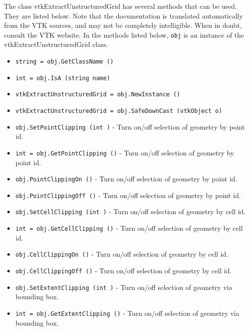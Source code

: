 The class vtkExtractUnstructuredGrid has several methods that can be used.
  They are listed below.
Note that the documentation is translated automatically from the VTK sources,
and may not be completely intelligible.  When in doubt, consult the VTK website.
In the methods listed below, \verb|obj| is an instance of the vtkExtractUnstructuredGrid class.
\begin{itemize}
\item  \verb|string = obj.GetClassName ()|

\item  \verb|int = obj.IsA (string name)|

\item  \verb|vtkExtractUnstructuredGrid = obj.NewInstance ()|

\item  \verb|vtkExtractUnstructuredGrid = obj.SafeDownCast (vtkObject o)|

\item  \verb|obj.SetPointClipping (int )| -  Turn on/off selection of geometry by point id.

\item  \verb|int = obj.GetPointClipping ()| -  Turn on/off selection of geometry by point id.

\item  \verb|obj.PointClippingOn ()| -  Turn on/off selection of geometry by point id.

\item  \verb|obj.PointClippingOff ()| -  Turn on/off selection of geometry by point id.

\item  \verb|obj.SetCellClipping (int )| -  Turn on/off selection of geometry by cell id.

\item  \verb|int = obj.GetCellClipping ()| -  Turn on/off selection of geometry by cell id.

\item  \verb|obj.CellClippingOn ()| -  Turn on/off selection of geometry by cell id.

\item  \verb|obj.CellClippingOff ()| -  Turn on/off selection of geometry by cell id.

\item  \verb|obj.SetExtentClipping (int )| -  Turn on/off selection of geometry via bounding box.

\item  \verb|int = obj.GetExtentClipping ()| -  Turn on/off selection of geometry via bounding box.


\end{itemize}
